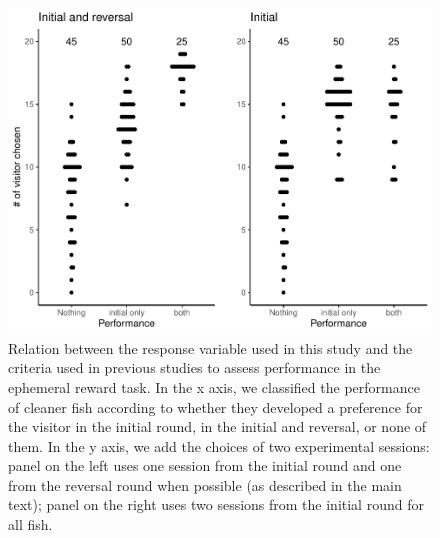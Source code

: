 \documentclass[
  12pt,
]{article}
\begin{document}
\begin{figure}
\includegraphics[width=1\linewidth]{manuscript_BE_files/figure-latex/rawdata-1} \caption{Relation between the response variable used in this study and the criteria used in previous studies to assess performance in the ephemeral reward task. In the x axis, we classified the performance of cleaner fish according to whether they developed a preference for the visitor in the initial round, in the initial and reversal, or none of them. In the y axis, we add the choices of two experimental sessions: panel on the left uses one session from the initial round and one from the reversal round when possible (as described in the main text); panel on the right uses two sessions from the initial round for all fish.}\label{fig:rawdata}
\end{figure}
\end{document}
